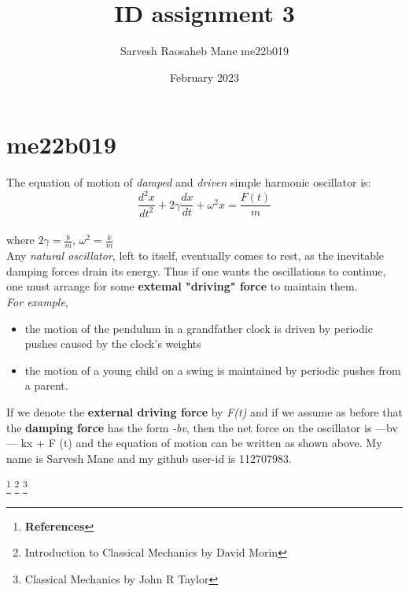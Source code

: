 \title{ID assignment 3}
\author{Sarvesh Raosaheb Mane me22b019}
\date{February 2023}


\maketitle

\section{me22b019}
The equation of motion of \emph{damped} and \emph{driven} simple harmonic oscillator is:
\[\frac{d^2x}{dt^2} + 2\gamma\frac{dx}{dt} + \omega^2x = \frac{F(t)}{m} \] \\
where $2\gamma= \frac{b}{m}$, $\omega^2= \frac{k}{m}$ \\

Any \emph{natural oscillator}, left to itself, eventually comes to rest, as the inevitable damping
forces drain its energy. Thus if one wants the oscillations to continue, one must arrange
for some \textbf{extemal "driving" force} to maintain them.\\
\textit{ For example}, 
\begin{itemize}
    \item the motion of the
pendulum in a grandfather clock is driven by periodic pushes caused by the clock's
weights 

 \item the motion of a young child on a swing is maintained by periodic pushes
from a parent.
\end{itemize}
If we denote the \textbf{external driving force} by \textit{F(t)} and if we assume as
before that the \textbf{damping force} has the form \textit{-bv}, then the net force on the oscillator
is —bv — kx + F (t) and the equation of motion can be written as shown above.
My name is Sarvesh Mane and my github user-id is 112707983.

\footnote{\textbf{References}}
\footnote{Introduction to Classical
Mechanics by David Morin}
\footnote{Classical Mechanics by John R Taylor}





